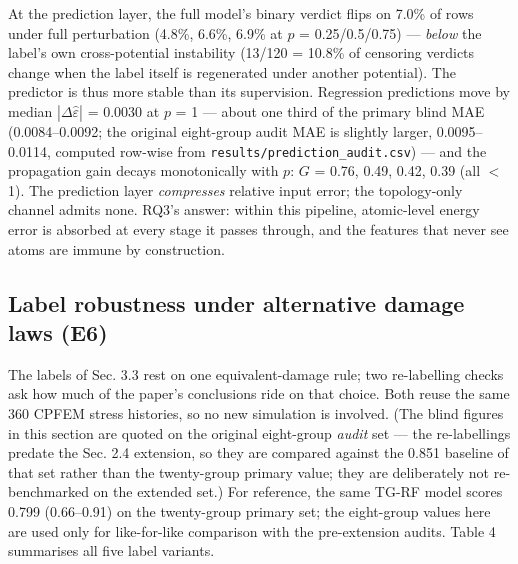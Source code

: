 \documentclass[11pt]{article}
\begin{document}
At the prediction layer, the full model's binary verdict flips on 7.0\% of rows under full perturbation (4.8\%, 6.6\%, 6.9\% at $p$ = 0.25/0.5/0.75) --- \textit{below} the label's own cross-potential instability (13/120 = 10.8\% of censoring verdicts change when the label itself is regenerated under another potential). The predictor is thus more stable than its supervision. Regression predictions move by median $|\Delta\hat{\varepsilon}|$ = 0.0030 at $p$ = 1 --- about one third of the primary blind MAE (0.0084--0.0092; the original eight-group audit MAE is slightly larger, 0.0095--0.0114, computed row-wise from \texttt{results/prediction\_audit.csv}) --- and the propagation gain decays monotonically with $p$: $G$ = 0.76, 0.49, 0.42, 0.39 (all $<$ 1). The prediction layer \textit{compresses} relative input error; the topology-only channel admits none. RQ3's answer: within this pipeline, atomic-level energy error is absorbed at every stage it passes through, and the features that never see atoms are immune by construction.

\subsection{Label robustness under alternative damage laws (E6)}

The labels of Sec. 3.3 rest on one equivalent-damage rule; two re-labelling checks ask how much of the paper's conclusions ride on that choice. Both reuse the same 360 CPFEM stress histories, so no new simulation is involved. (The blind figures in this section are quoted on the original eight-group \textit{audit} set --- the re-labellings predate the Sec. 2.4 extension, so they are compared against the 0.851 baseline of that set rather than the twenty-group primary value; they are deliberately not re-benchmarked on the extended set.) For reference, the same TG-RF model scores 0.799 (0.66--0.91) on the twenty-group primary set; the eight-group values here are used only for like-for-like comparison with the pre-extension audits. Table 4 summarises all five label variants.
\end{document}
